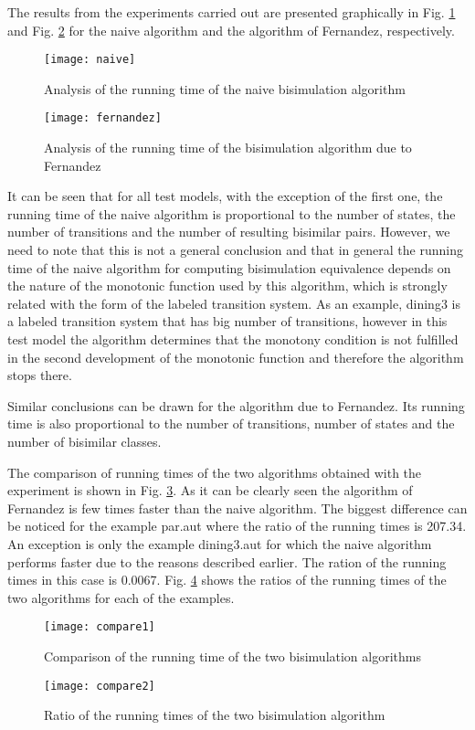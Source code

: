 The results from the experiments carried out are presented graphically in Fig. \ref{fig:naiveAnalysis} and Fig. \ref{fig:fernandezAnalysis} for the naive algorithm and the algorithm of Fernandez, respectively. 

\begin{figure}[!ht]
\centering
\texttt{[image: naive]}
\caption{Analysis of the running time of the naive bisimulation algorithm}
\label{fig:naiveAnalysis}
\end{figure}

\begin{figure}[!ht]
\centering
\texttt{[image: fernandez]}
\caption{Analysis of the running time of the bisimulation algorithm due to Fernandez}
\label{fig:fernandezAnalysis}
\end{figure}

It can be seen that for all test models, with the exception of the first one, the running time of the naive algorithm is proportional to the number of states, the number of transitions and the number of resulting bisimilar pairs. However, we need to note that this is not a general conclusion and that in general the running time of the naive algorithm for computing bisimulation equivalence depends on the nature of the monotonic function used by this algorithm, which is strongly related with the form of the labeled transition system. As an example, dining3 is a labeled transition system that has big number of transitions, however in this test model the algorithm determines that the monotony condition is not fulfilled in the second development of the monotonic function and therefore the algorithm stops there.

Similar conclusions can be drawn for the algorithm due to Fernandez. Its running time is also proportional to the number of transitions, number of states and the number of bisimilar classes. 

The comparison of running times of the two algorithms obtained with the experiment is shown in Fig. \ref{fig:comparison1}. As it can be clearly seen the algorithm of Fernandez is few times faster than the naive algorithm. The biggest difference can be noticed for the example par.aut where the ratio of the running times is 207.34. An exception is only the example dining3.aut for which the naive algorithm performs faster due to the reasons described earlier. The ration of the running times in this case is 0.0067. Fig. \ref{fig:comparison2} shows the ratios of the running times of the two algorithms for each of the examples.

\begin{figure}[!ht]
\centering
\texttt{[image: compare1]}
\caption{Comparison of the running time of the two bisimulation algorithms}
\label{fig:comparison1}
\end{figure}

\begin{figure}[!ht]
\centering
\texttt{[image: compare2]}
\caption{Ratio of the running times of the two bisimulation algorithm}
\label{fig:comparison2}
\end{figure}